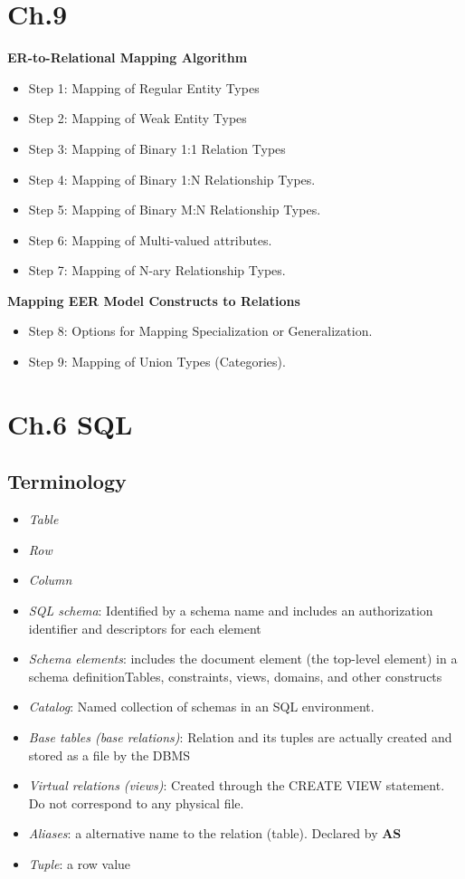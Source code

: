 \begin{multicols}{2}
\section{Ch.9}
\textbf{ER-to-Relational Mapping Algorithm}
\begin{itemize}
    \item Step 1: Mapping of Regular Entity Types
    \item Step 2: Mapping of Weak Entity Types
    \item Step 3: Mapping of Binary 1:1 Relation Types
    \item Step 4: Mapping of Binary 1:N Relationship Types.
    \item Step 5: Mapping of Binary M:N Relationship Types.
    \item Step 6: Mapping of Multi-valued attributes.
    \item Step 7: Mapping of N-ary Relationship Types.
\end{itemize}

\noindent\textbf{Mapping EER Model Constructs to Relations}
\begin{itemize}
    \item Step 8: Options for Mapping Specialization or Generalization.
    \item Step 9: Mapping of Union Types (Categories).
\end{itemize}


\section{Ch.6 SQL}
\subsection{Terminology}
\begin{itemize}
    \item \textit{Table}
    \item \textit{Row}
    \item \textit{Column}
    \item \textit{SQL schema}: Identified by a schema name and includes an authorization identifier and descriptors
for each element
    \item \textit{Schema elements}: includes the document element (the top-level element) in a schema definitionTables, constraints, views, domains, and other 
constructs
    \item \textit{Catalog}: Named collection of schemas in an SQL environment.
    \item \textit{Base tables (base relations)}: Relation and its tuples are actually created and 
        stored as a file by the DBMS
    \item \textit{Virtual relations (views)}: Created through the CREATE VIEW statement. 
        Do not correspond to any physical file.
    \item \textit{Aliases}: a alternative name to the relation (table). Declared by \textbf{AS}
    \item \textit{Tuple}: a row value
\end{itemize} 


\end{multicols}
